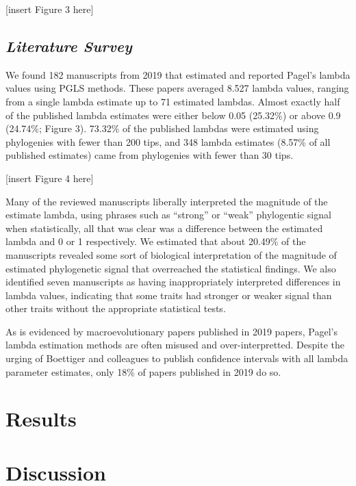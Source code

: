 \documentclass[
]{article}
\begin{document}
{[}insert Figure 3 here{]}

\hypertarget{literature-survey-1}{%
\subsection{\texorpdfstring{\emph{Literature
Survey}}{Literature Survey}}\label{literature-survey-1}}

We found 182 manuscripts from 2019 that estimated and reported Pagel's
lambda values using PGLS methods. These papers averaged 8.527 lambda
values, ranging from a single lambda estimate up to 71 estimated
lambdas. Almost exactly half of the published lambda estimates were
either below 0.05 (25.32\%) or above 0.9 (24.74\%; Figure 3). 73.32\% of
the published lambdas were estimated using phylogenies with fewer than
200 tips, and 348 lambda estimates (8.57\% of all published estimates)
came from phylogenies with fewer than 30 tips. \hfill\break

{[}insert Figure 4 here{]} \hfill\break

Many of the reviewed manuscripts liberally interpreted the magnitude of
the estimate lambda, using phrases such as ``strong'' or ``weak''
phylogentic signal when statistically, all that was clear was a
difference between the estimated lambda and 0 or 1 respectively. We
estimated that about 20.49\% of the manuscripts revealed some sort of
biological interpretation of the magnitude of estimated phylogenetic
signal that overreached the statistical findings. We also identified
seven manuscripts as having inappropriately interpreted differences in
lambda values, indicating that some traits had stronger or weaker signal
than other traits without the appropriate statistical tests.
\hfill\break

As is evidenced by macroevolutionary papers published in 2019 papers,
Pagel's lambda estimation methods are often misused and
over-interpretted. Despite the urging of Boettiger and colleagues to
publish confidence intervals with all lambda parameter estimates, only
18\% of papers published in 2019 do so.

\hypertarget{results-1}{%
\section{Results}\label{results-1}}

\hypertarget{discussion}{%
\section{Discussion}\label{discussion}}
\end{document}
